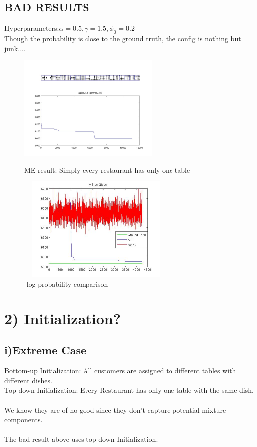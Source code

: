 \documentclass{article}
\begin{document}
\begin{spacing}{1.1}
\subsection{BAD RESULTS}
Hyperparameters:$\alpha=0.5,\gamma=1.5,\phi_{0}=0.2$\\
Though the probability is close to the ground truth, the config is nothing but junk....
\begin{figure}[h] 
  \begin{minipage}[b]{0.5\textwidth} 
    \centering 
    \includegraphics[width=3 in,height=2in]{direct_me.jpg} 
    \caption{ME result: Simply every restaurant has only one table} 
    \label{fig:by:table} 
  \end{minipage}%
  \begin{minipage}[b]{0.5\textwidth} 
    \centering 
    \includegraphics[width=3in,height=2in]{hdp_com2.jpg} 
    \caption{-log probability comparison}
    \label{fig:by:table}  
   \end{minipage}%
\end{figure}




\section{2) Initialization?}

\subsection{i)Extreme Case}
Bottom-up Initialization: All customers are assigned to different tables with different dishes.\\
Top-down Initialization: Every Restaurant has only one table with the same dish.\\ \\
We know they are of no good since they don't capture potential mixture components.\\ \\
The bad result above uses top-down Initialization.

\end{spacing}
\end{document}
